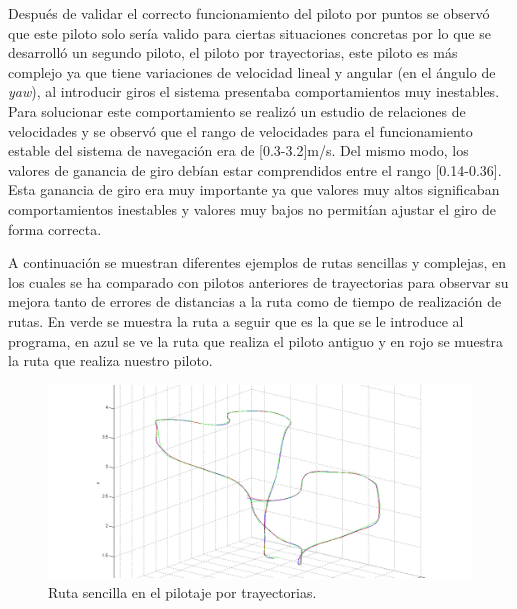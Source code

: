 \hspace{1cm} Después de validar el correcto funcionamiento del piloto por puntos se observó que este piloto solo sería valido para ciertas situaciones concretas por lo que se desarrolló un segundo piloto, el piloto por trayectorias, este piloto es más complejo ya que tiene variaciones de velocidad lineal y angular (en el ángulo de \textit{yaw}), al introducir giros el sistema presentaba comportamientos muy inestables. Para solucionar este comportamiento se realizó un estudio de relaciones de velocidades y se observó que el rango de velocidades para el funcionamiento estable del sistema de navegación era de [0.3-3.2]m/s. Del mismo modo, los valores de ganancia de giro debían estar comprendidos entre el rango [0.14-0.36]. Esta ganancia de giro era muy importante ya que valores muy altos significaban comportamientos inestables y valores muy bajos no permitían ajustar el giro de forma correcta. 

\hspace{1cm} A continuación se muestran diferentes ejemplos de rutas sencillas y complejas, en los cuales se ha comparado con pilotos anteriores de trayectorias para observar su mejora tanto de errores de distancias a la ruta como de tiempo de realización de rutas. En verde se muestra la ruta a seguir que es la que se le introduce al programa, en azul se ve la ruta que realiza el piloto antiguo y en rojo se muestra la ruta que realiza nuestro piloto.

\begin{figure}[H]
	\begin{center}
		\includegraphics[width=1.0\textwidth]{imag/IMG40.png}
				\caption{Ruta sencilla en el pilotaje por trayectorias.}
		\label{fig:Ruta sencilla en trayectoria.}	
	\end{center}
\end{figure}

